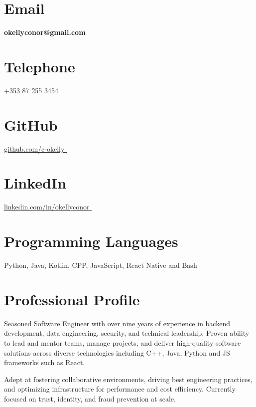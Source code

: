 \documentclass[]{cv-style}
\begin{document}

\begin{aside}
 \section{Email}
    {\textbf{okellyconor@gmail.com}}
    ~
  \section{Telephone}
    +353 87 255 3454
    ~
  \section{GitHub}
    \href{https://github.com/c-okelly}{github.com/c-okelly }
    ~
 \section{LinkedIn}    
    \href{https://linkedin.com/in/okellyconor}{linkedin.com/in/okellyconor }
    ~
\section{Programming Languages}   
	Python, Java, Kotlin, CPP,
	JavaScript, React Native and Bash
    ~
    ~
\end{aside}

\small
\section{Professional Profile}

Seasoned Software Engineer with over nine years of experience in backend development, data engineering, security, and technical leadership. Proven ability to lead and mentor teams, manage projects, and deliver high-quality software solutions across diverse technologies including C++, Java, Python and JS frameworks such as React.

Adept at fostering collaborative environments, driving best engineering practices, and optimizing infrastructure for performance and cost efficiency. Currently focused on trust, identity, and fraud prevention at scale.
\end{document}
